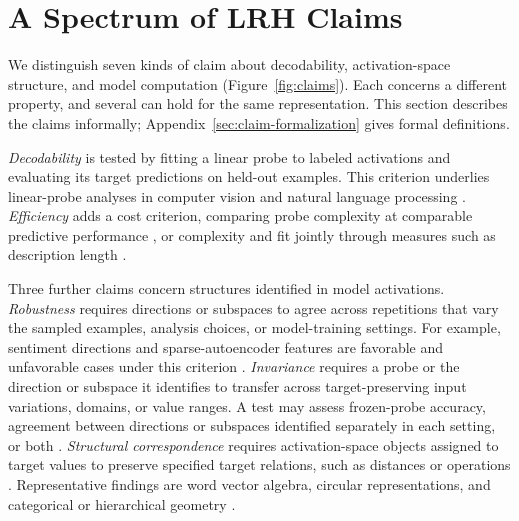 \documentclass[11pt]{article}
\newcommand{\LRH}{LRH}
\begin{document}



\section{A Spectrum of \LRH{} Claims}
\label{sec:weak-strong}

We distinguish seven kinds of claim about decodability, activation-space structure, and model computation (Figure~\ref{fig:claims}).
Each concerns a different property, and several can hold for the same representation.
This section describes the claims informally; Appendix~\ref{sec:claim-formalization} gives formal definitions.

\emph{Decodability} is tested by fitting a linear probe to labeled activations and evaluating its target predictions on held-out examples.
This criterion underlies linear-probe analyses in computer vision and natural language processing \citep{alain2018understanding,liu2019linguistic,belinkov2022probing}.
\emph{Efficiency} adds a cost criterion, comparing probe complexity at comparable predictive performance \citep{gurnee2023language}, or complexity and fit jointly through measures such as description length \citep{voita2020information}.

Three further claims concern structures identified in model activations.
\emph{Robustness} requires directions or subspaces to agree across repetitions that vary the sampled examples, analysis choices, or model-training settings.
For example, sentiment directions and sparse-autoencoder features are favorable and unfavorable cases under this criterion \citep{tigges2023linear,chanin2025absorption}.
\emph{Invariance} requires a probe or the direction or subspace it identifies to transfer across target-preserving input variations, domains, or value ranges.
A test may assess frozen-probe accuracy, agreement between directions or subspaces identified separately in each setting, or both \citep{gurnee2023language,marks2024geometry,park2024linear}.
\emph{Structural correspondence} requires activation-space objects assigned to target values to preserve specified target relations, such as distances or operations \citep{shepard1970secondorder,kriegeskorte2008representational,shea2018structural}.
Representative findings are word vector algebra, circular representations, and categorical or hierarchical geometry \citep{mikolov2013linguistic,engels2025notall,park2025geometry}.
\end{document}
